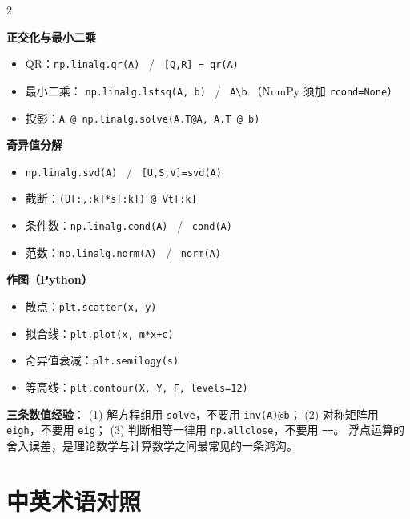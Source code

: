 \documentclass[11pt,a4paper,openany]{ctexbook}
\newcommand{\minihead}[1]{%
  \par\addvspace{8pt}%
  {\noindent\sffamily\bfseries\large\color{qing} #1\par}%
  \vspace{-4pt}\noindent{\color{qing!28}\rule{\linewidth}{0.6pt}}\par\vspace{5pt}}
\begin{document}
\begin{multicols}{2}
\minihead{正交化与最小二乘}
\begin{itemize}[leftmargin=1.4em, itemsep=2pt]
\item QR：\texttt{np.linalg.qr(A)} \ / \ \texttt{[Q,R] = qr(A)}
\item 最小二乘：
      \texttt{np.linalg.lstsq(A, b)} \ / \ \texttt{A\textbackslash b}
      （NumPy 须加 \texttt{rcond=None}）
\item 投影：\texttt{A @ np.linalg.solve(A.T@A, A.T @ b)}
\end{itemize}

\minihead{奇异值分解}
\begin{itemize}[leftmargin=1.4em, itemsep=2pt]
\item \texttt{np.linalg.svd(A)} \ / \ \texttt{[U,S,V]=svd(A)}
\item 截断：\texttt{(U[:,:k]*s[:k]) @ Vt[:k]}
\item 条件数：\texttt{np.linalg.cond(A)} \ / \ \texttt{cond(A)}
\item 范数：\texttt{np.linalg.norm(A)} \ / \ \texttt{norm(A)}
\end{itemize}

\minihead{作图（Python）}
\begin{itemize}[leftmargin=1.4em, itemsep=2pt]
\item 散点：\texttt{plt.scatter(x, y)}
\item 拟合线：\texttt{plt.plot(x, m*x+c)}
\item 奇异值衰减：\texttt{plt.semilogy(s)}
\item 等高线：\texttt{plt.contour(X, Y, F, levels=12)}
\end{itemize}

\end{multicols}

\begin{keypoint}
\textbf{三条数值经验}：
(1) 解方程组用 \texttt{solve}，不要用 \texttt{inv(A)@b}；
(2) 对称矩阵用 \texttt{eigh}，不要用 \texttt{eig}；
(3) 判断相等一律用 \texttt{np.allclose}，不要用 \texttt{==}。
浮点运算的舍入误差，是理论数学与计算数学之间最常见的一条鸿沟。
\end{keypoint}

\chapter{中英术语对照}
\label{app:terms}
\end{document}
